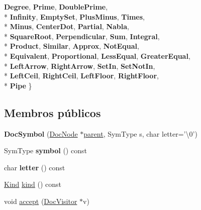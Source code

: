\begin{DoxyCompactItemize}
{\bfseries Degree}, 
{\bfseries Prime}, 
{\bfseries Double\-Prime}, 
\\*
{\bfseries Infinity}, 
{\bfseries Empty\-Set}, 
{\bfseries Plus\-Minus}, 
{\bfseries Times}, 
\\*
{\bfseries Minus}, 
{\bfseries Center\-Dot}, 
{\bfseries Partial}, 
{\bfseries Nabla}, 
\\*
{\bfseries Square\-Root}, 
{\bfseries Perpendicular}, 
{\bfseries Sum}, 
{\bfseries Integral}, 
\\*
{\bfseries Product}, 
{\bfseries Similar}, 
{\bfseries Approx}, 
{\bfseries Not\-Equal}, 
\\*
{\bfseries Equivalent}, 
{\bfseries Proportional}, 
{\bfseries Less\-Equal}, 
{\bfseries Greater\-Equal}, 
\\*
{\bfseries Left\-Arrow}, 
{\bfseries Right\-Arrow}, 
{\bfseries Set\-In}, 
{\bfseries Set\-Not\-In}, 
\\*
{\bfseries Left\-Ceil}, 
{\bfseries Right\-Ceil}, 
{\bfseries Left\-Floor}, 
{\bfseries Right\-Floor}, 
\\*
{\bfseries Pipe}
 \}
\end{DoxyCompactItemize}
\subsection*{Membros públicos}
\begin{DoxyCompactItemize}
\item 
\hypertarget{class_doc_symbol_a5b5dbf6558f9850b47e8d22b7b11cb9c}{{\bfseries Doc\-Symbol} (\hyperlink{class_doc_node}{Doc\-Node} $\ast$\hyperlink{class_doc_node_abd7f070d6b0a38b4da71c2806578d19d}{parent}, Sym\-Type s, char letter='\textbackslash{}0')}\label{class_doc_symbol_a5b5dbf6558f9850b47e8d22b7b11cb9c}

\item 
\hypertarget{class_doc_symbol_a5dd6ac90076baf0f269002683c9088fe}{Sym\-Type {\bfseries symbol} () const }\label{class_doc_symbol_a5dd6ac90076baf0f269002683c9088fe}

\item 
\hypertarget{class_doc_symbol_a6a08adb667b210e9a46bbb928f5ba219}{char {\bfseries letter} () const }\label{class_doc_symbol_a6a08adb667b210e9a46bbb928f5ba219}

\item 
\hyperlink{class_doc_node_aa10c9e8951b8ccf714a59ec321bdac5b}{Kind} \hyperlink{class_doc_symbol_aa9d037bed9f9a083d0cd01485637d843}{kind} () const 
\item 
void \hyperlink{class_doc_symbol_a7ba716e854ae2f8f87a4eb2140e302b6}{accept} (\hyperlink{class_doc_visitor}{Doc\-Visitor} $\ast$v)
\end{DoxyCompactItemize}
